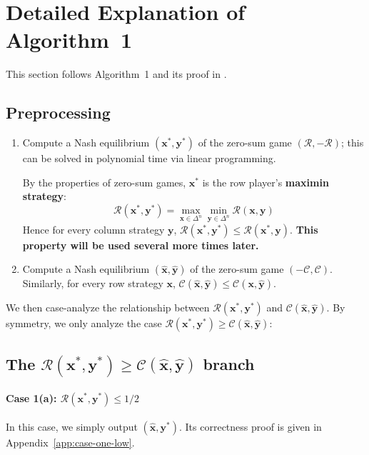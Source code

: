 \section{Detailed Explanation of Algorithm~1}
\label{app:algorithm-one-explanation}

This section follows Algorithm~1 and its proof in \cite[Section~3]{12WSNE}.

\subsection{Preprocessing}

\begin{enumerate}
  \item Compute a Nash equilibrium \((\mathbf{x}^*, \mathbf{y}^*)\) of the zero-sum game \((\mathcal{R}, -\mathcal{R})\); this can be solved in polynomial time via linear programming.

        By the properties of zero-sum games, \(\mathbf{x}^*\) is the row player's \textbf{maximin strategy}:
        \[
          \mathcal{R}(\mathbf{x}^*, \mathbf{y}^*) = \max_{\mathbf{x} \in \Delta^n} \min_{\mathbf{y} \in \Delta^n} \mathcal{R}(\mathbf{x}, \mathbf{y})
        \]
        Hence for every column strategy \(\mathbf{y}\), \(\mathcal{R}(\mathbf{x}^*, \mathbf{y}^*) \le \mathcal{R}(\mathbf{x}^*, \mathbf{y})\). \textbf{This property will be used several more times later.}

  \item Compute a Nash equilibrium \((\hat{\mathbf{x}}, \hat{\mathbf{y}})\) of the zero-sum game \((-\mathcal{C}, \mathcal{C})\). Similarly, for every row strategy \(\mathbf{x}\), \(\mathcal{C}(\hat{\mathbf{x}}, \hat{\mathbf{y}}) \le \mathcal{C}(\mathbf{x}, \hat{\mathbf{y}})\).
\end{enumerate}

We then case-analyze the relationship between \(\mathcal{R}(\mathbf{x}^*, \mathbf{y}^*)\) and \(\mathcal{C}(\hat{\mathbf{x}}, \hat{\mathbf{y}})\). By symmetry, we only analyze the case \textbf{\(\mathcal{R}(\mathbf{x}^*, \mathbf{y}^*) \ge \mathcal{C}(\hat{\mathbf{x}}, \hat{\mathbf{y}})\)}:

\subsection{The \texorpdfstring{\(\mathcal{R}(\mathbf{x}^*, \mathbf{y}^*) \ge \mathcal{C}(\hat{\mathbf{x}}, \hat{\mathbf{y}})\)}{R(x*,y*) >= C(xh,yh)} branch}

\paragraph{Case 1(a): \(\mathcal{R}(\mathbf{x}^*, \mathbf{y}^*) \le 1/2\)}
In this case, we simply output \((\hat{\mathbf{x}}, \mathbf{y}^*)\). Its correctness proof is given in Appendix~\ref{app:case-one-low}.


